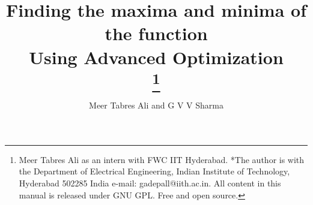 \documentclass[journal,10pt,twocolumn]{article}
\begin{document}
\newtheorem{theorem}{Theorem}[section]
\newtheorem{problem}{Problem}
\newtheorem{proposition}{Proposition}[section]
\newtheorem{lemma}{Lemma}[section]
\newtheorem{corollary}[theorem]{Corollary}
\newtheorem{example}{Example}[section]
\newtheorem{definition}[problem]{Definition}
\newcommand{\BEQA}{\begin{eqnarray}}
\newcommand{\EEQA}{\end{eqnarray}}
\newcommand{\define}{\stackrel{\triangle}{=}}
\newcommand*\circled[1]{\tikz[baseline=(char.base)]{
    \node[shape=circle,draw,inner sep=2pt] (char) {#1};}}

%
\providecommand{\mbf}{\mathbf}
\providecommand{\pr}[1]{\ensuremath{\Pr\left(#1\right)}}
\providecommand{\re}[1]{\ensuremath{\text{Re}\left(#1\right)}}
\providecommand{\im}[1]{\ensuremath{\text{Im}\left(#1\right)}}
\providecommand{\qfunc}[1]{\ensuremath{Q\left(#1\right)}}
\providecommand{\sbrak}[1]{\ensuremath{{}\left[#1\right]}}
\providecommand{\lsbrak}[1]{\ensuremath{{}\left[#1\right.}}
\providecommand{\rsbrak}[1]{\ensuremath{{}\left.#1\right]}}
\providecommand{\brak}[1]{\ensuremath{\left(#1\right)}}
\providecommand{\lbrak}[1]{\ensuremath{\left(#1\right.}}
\providecommand{\rbrak}[1]{\ensuremath{\left.#1\right)}}
\providecommand{\cbrak}[1]{\ensuremath{\left\{#1\right\}}}
\providecommand{\lcbrak}[1]{\ensuremath{\left\{#1\right.}}
\providecommand{\rcbrak}[1]{\ensuremath{\left.#1\right\}}}
\newcommand{\sgn}{\mathop{\mathrm{sgn}}}
\providecommand{\system}{\overset{\mathcal{H}}{ \longleftrightarrow}}
\newcommand{\solution}{\noindent \textbf{Solution: }}
\newcommand{\cosec}{\,\text{cosec}\,}
\providecommand{\dec}[2]{\ensuremath{\overset{#1}{\underset{#2}{\gtrless}}}}
\newcommand{\myvec}[1]{\ensuremath{\begin{pmatrix}#1\end{pmatrix}}}
\newcommand{\mydet}[1]{\ensuremath{\begin{vmatrix}#1\end{vmatrix}}}
	\newcommand*{\permcomb}[4][0mu]{{{}^{#3}\mkern#1#2_{#4}}}
\newcommand*{\perm}[1][-3mu]{\permcomb[#1]{P}}
\newcommand*{\comb}[1][-1mu]{\permcomb[#1]{C}}
\let\vec\mathbf
\title{
{Finding the maxima and minima of the function \\
Using Advanced Optimization}\\
\thanks {Meer Tabres Ali as an intern with FWC IIT Hyderabad. *The author is with the Department of Electrical Engineering, Indian Institute of Technology, Hyderabad 502285 India e-mail: gadepall@iith.ac.in. All content in this manual is released under GNU GPL. Free and open source.}
}
\author{Meer Tabres Ali and G V V Sharma}
\maketitle
\tableofcontents
\end{document}
